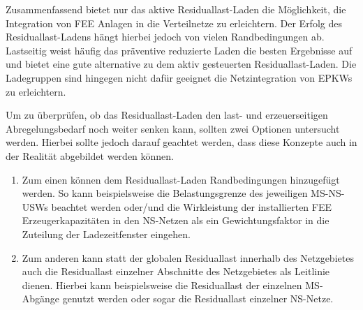 Zusammenfassend bietet nur das aktive Residuallast-Laden die Möglichkeit, die Integration von \gls{FEE} Anlagen in die Verteilnetze zu erleichtern.
Der Erfolg des Residuallast-Ladens hängt hierbei jedoch von vielen Randbedingungen ab.
Lastseitig weist häufig das präventive reduzierte Laden die besten Ergebnisse auf und bietet eine gute alternative zu dem aktiv gesteuerten Residuallast-Laden.
Die Ladegruppen sind hingegen nicht dafür geeignet die Netzintegration von \glspl{EPKW} zu erleichtern.\medskip

Um zu überprüfen, ob das Residuallast-Laden den last- und erzeuerseitigen Abregelungsbedarf noch weiter senken kann, sollten zwei Optionen untersucht werden.
Hierbei sollte jedoch darauf geachtet werden, dass diese Konzepte auch in der Realität abgebildet werden können.

\begin{enumerate}
	\item Zum einen können dem Residuallast-Laden Randbedingungen hinzugefügt werden.
	So kann beispielsweise die Belastungsgrenze des jeweiligen \gls{MS}-\gls{NS}-\glspl{USW} beachtet werden oder/und die Wirkleistung der installierten \gls{FEE} Erzeugerkapazitäten in den \gls{NS}-Netzen als ein Gewichtungsfaktor in die Zuteilung der Ladezeitfenster eingehen.
	\item Zum anderen kann statt der globalen Residuallast innerhalb des Netzgebietes auch die Residuallast einzelner Abschnitte des Netzgebietes als Leitlinie dienen.
	Hierbei kann beispielsweise die Residuallast der einzelnen \gls{MS}-Abgänge genutzt werden oder sogar die Residuallast einzelner \gls{NS}-Netze.
\end{enumerate}


